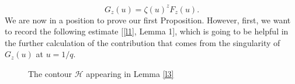 \documentclass[12pt]{amsart}
\numberwithin{equation}{section}
\theoremstyle{remark}
\theoremstyle{remark}
\theoremstyle{definition}
\begin{document}
\begin{equation}\label{l621}
G_z(u)=\zeta(u)^zF_z(u).
\end{equation}
We are now in a position to prove our first Proposition. However, first, we want to record the following estimate [\ref{l1}, Lemma 1], which is going to be helpful in the further calculation of the contribution that comes from the singularity of $G_z(u)$ at $u=1/q$. 
\begin{figure}[h]
    \centering
    
    \caption{The contour $\mathcal{H}$ appearing in Lemma \ref{l3}}
    \label{A}

\begin{tikzpicture}[x=0.75pt,y=0.75pt,yscale=-1,xscale=1]


\end{tikzpicture}
\end{figure}
\end{document}
